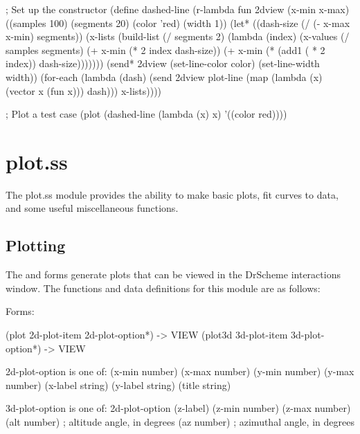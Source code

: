 \documentclass{article}
\begin{document}
{\begin{schemedisplay}
; Set up the constructor
(define dashed-line
  (r-lambda fun 2dview (x-min x-max) ((samples 100) (segments 20) (color 'red) (width 1))
   (let* ((dash-size (/ (- x-max x-min) segments))
          (x-lists (build-list 
                    (/ segments 2) 
                    (lambda (index)                                    
                      (x-values 
                       (/ samples segments) 
                       (+ x-min (* 2 index dash-size))
                       (+ x-min (* (add1 ( * 2 index)) dash-size)))))))
     (send* 2dview 
       (set-line-color color)
       (set-line-width width))
     (for-each 
      (lambda (dash)
        (send 2dview plot-line 
              (map (lambda (x) (vector x (fun x))) dash))) 
      x-lists))))
       
; Plot a test case
(plot (dashed-line (lambda (x) x) '((color red))))
\end{schemedisplay}

\pagebreak

\section{plot.ss}


The plot.ss module provides the ability to make basic plots, fit curves to data, and some useful miscellaneous functions.

\subsection{Plotting}


The  and  forms generate plots that can be viewed in the DrScheme interactions window. The functions and data definitions for this  module are as follows:



\begin{schemedisplay}

       
Forms:
       
 (plot 2d-plot-item 2d-plot-option*) -> VIEW
 (plot3d 3d-plot-item 3d-plot-option*) -> VIEW
     
2d-plot-option is one of:
 (x-min number)
 (x-max number)
 (y-min number)
 (y-max number)
 (x-label string)
 (y-label string)
 (title string)
     
3d-plot-option is one of:
 2d-plot-option
 (z-label)
 (z-min number)
 (z-max number)
 (alt number)    ; altitude angle, in degrees
 (az number)     ; azimuthal angle, in degrees
     

\end{schemedisplay}}
\end{document}
